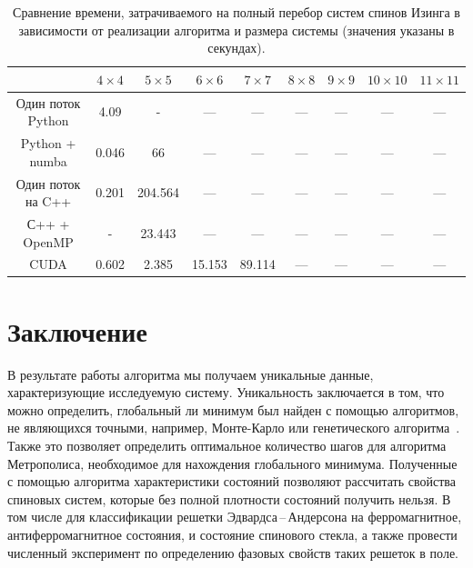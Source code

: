 \documentclass[10pt]{article}
\begin{document}
	\begin{table}[h]
		\begin{center}
			\begin{tabular}{|c|c|c|c|c|c|c|c|c|}
				\hline
				& $4 \times 4$ & $5 \times 5$ & $6 \times 6$ & $7 \times 7$ & $8 \times 8$ & $9 \times 9$ & $10 \times 10$ & $11 \times 11$  \\ \hline
				Один поток Python & 4.09         & -            & ---          & ---          & ---          & ---          & ---          & ---           \\ \hline
				Python + numba    & 0.046        & 66           & ---          & ---          & ---          & ---          & ---          & ---           \\ \hline
				Один поток на C++ & 0.201        & 204.564      & ---          & ---          & ---          & ---          & ---          & ---           \\ \hline
				С++ + OpenMP      & -            & 23.443       & ---          & ---          & ---          & ---          & ---          & ---           \\ \hline
				CUDA              & 0.602        & 2.385        & 15.153       & 89.114          & ---          & ---          & ---          & ---        \\ \hline
			\end{tabular}
		\end{center}
		\caption{Сравнение времени, затрачиваемого на полный перебор систем спинов Изинга в зависимости от реализации алгоритма и размера системы (значения указаны в секундах).}
		\label{Time_Table}
	\end{table}
	
	\section*{Заключение}
	В результате работы алгоритма мы получаем уникальные данные, характеризующие исследуемую систему. Уникальность заключается в том, что можно определить, глобальный ли минимум был найден с помощью алгоритмов, не являющихся точными, например, Монте-Карло или генетического алгоритма~\cite{Panchenko2007}. Также это позволяет определить оптимальное количество шагов для алгоритма Метрополиса, необходимое для нахождения глобального минимума.
	Полученные с помощью алгоритма характеристики состояний позволяют рассчитать свойства спиновых систем, которые без полной плотности состояний получить нельзя. В том числе для классификации решетки Эдвардса\,--\,Андерсона на ферромагнитное, антиферромагнитное состояния, и состояние спинового стекла, а также провести численный эксперимент по определению фазовых свойств таких решеток в поле.
	
\end{document}
